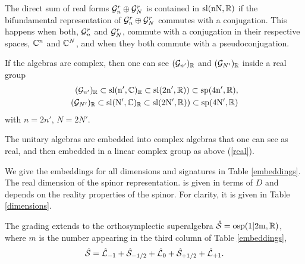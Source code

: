 \documentclass[a4paper,12pt]{article}
\begin{document}
The direct sum of  real forms $\mathcal{G}^r_{n}\oplus \mathcal{G}^r_{N}$ is
contained in $\rm{sl}(nN,\mathbb{R})$ if the bifundamental representation
of $\mathcal{G}^r_{n}\oplus \mathcal{G}^r_{N}$ commutes with a conjugation. This
happens when both, $\mathcal{G}^r_{n}$ and $\mathcal{G}^r_{N}$, commute with a
conjugation in their respective spaces, $\mathbb{C}^n$ and $\mathbb{C}^N$, and
when they both commute with a pseudoconjugation.



If the algebras are complex, then one can see  $(\mathcal{G}_{n'})_{\mathbb{R}}$ and
$(\mathcal{G}_{N'})_{\mathbb{R}}$ inside a real group
\begin{eqnarray}(\mathcal{G}_{n'})_{\mathbb{R}}\subset
\rm{sl}(n',\mathbb{C})_{\mathbb{R}}\subset\rm{sl}(2n',\mathbb{R}))\subset
\rm{sp}(4n',\mathbb{R}),\nonumber\\ (\mathcal{G}_{N'})_{\mathbb{R}}\subset
\rm{sl}(N',\mathbb{C})_{\mathbb{R}}\subset\rm{sl}(2N',\mathbb{R}))\subset
\rm{sp}(4N',\mathbb{R})\label{real}\end{eqnarray}
 with $n=2n'$, $N=2N'$.


The unitary algebras are embedded into complex algebras that one
can see as real, and then embedded in a linear complex group as
above (\ref{real}).

We give the embeddings for all dimensions and signatures in Table
\ref{embeddings}. The real dimension of the spinor representation.
 is given in terms of $D$ and depends on the reality
properties of the spinor. For clarity, it is given in Table
\ref{dimensions}.

The grading extends to the orthosymplectic superalgebra
$\hat{\mathcal{S}}=\rm{osp}(1|2m,\mathbb{R})$, where $m$ is the number appearing in
the third column of Table \ref{embeddings},
$$\hat{\mathcal{S}}=\hat{\mathcal{L}}_{-1}+\hat{\mathcal{S}}_{-1/2}+\hat{\mathcal{L}}_{0}+\hat{\mathcal{S}}_{+1/2}+\hat{\mathcal{L}}_{+1}.$$
\end{document}
